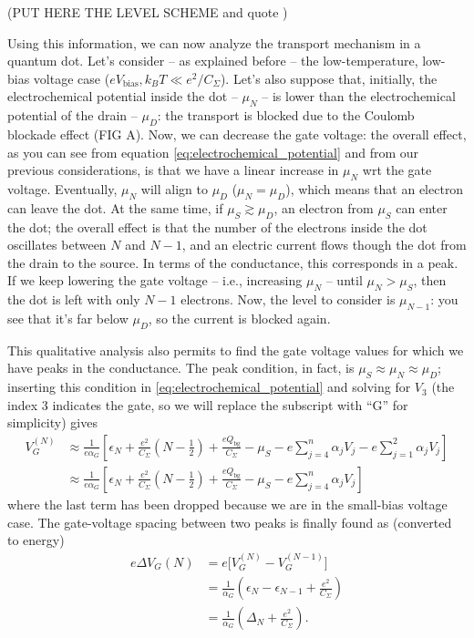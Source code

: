 \documentclass[a4paper,twoside,11pt]{book}
\begin{document}
(PUT HERE THE LEVEL SCHEME and quote \citep[adapted from][]{Fasth2007})

Using this information, we can now analyze the transport mechanism in a quantum dot. Let's consider -- as explained before -- the low-temperature, low-bias voltage case ($eV_{\text{bias}},k_BT \ll e^2/C_{\Sigma}$). Let's also suppose that, initially, the electrochemical potential inside the dot -- $\mu_N$ -- is lower than the electrochemical potential of the drain -- $\mu_D$: the transport is blocked due to the Coulomb blockade effect (FIG A). Now, we can decrease the gate voltage: the overall effect, as you can see from equation \eqref{eq:electrochemical_potential} and from our previous considerations, is that we have a linear increase in $\mu_N$ wrt the gate voltage. Eventually, $\mu_N$ will align to $\mu_D$ ($\mu_N = \mu_D$), which means that an electron can leave the dot. At the same time, if $\mu_S \gtrsim \mu_D$, an electron from $\mu_S$ can enter the dot; the overall effect is that the number of the electrons inside the dot oscillates between $N$ and $N-1$, and an electric current flows though the dot from the drain to the source. In terms of the conductance, this corresponds in a peak. If we keep lowering the gate voltage -- i.e., increasing $\mu_N$ -- until $\mu_N > \mu_S$, then the dot is left with only $N-1$ electrons. Now, the level to consider is $\mu_{N-1}$: you see that it's far below $\mu_D$, so the current is blocked again.

This qualitative analysis also permits to find the gate voltage values for which we have peaks in the conductance. The peak condition, in fact, is $\mu_S\approx\mu_N\approx\mu_D$; inserting this condition in \eqref{eq:electrochemical_potential} and solving for $V_3$ (the index 3 indicates the gate, so we will replace the subscript with ``G'' for simplicity) gives
\begin{align}
	V_G^{(N)}
	&\approx \frac{1}{e\alpha_G}\left[ \epsilon_N + \frac{e^2}{C_{\Sigma}}\left(N-\frac{1}{2}\right) + \frac{eQ_{\text{bg}}}{C_{\Sigma}} - \mu_S - e\sum_{j=4}^{n}\alpha_jV_j - e\sum_{j=1}^{2}\alpha_jV_j \right] \\
	&\approx \frac{1}{e\alpha_G}\left[ \epsilon_N + \frac{e^2}{C_{\Sigma}}\left(N-\frac{1}{2}\right) + \frac{eQ_{\text{bg}}}{C_{\Sigma}} - \mu_S - e\sum_{j=4}^{n}\alpha_jV_j \right]
\end{align}
where the last term has been dropped because we are in the small-bias voltage case. The gate-voltage spacing between two peaks is finally found as (converted to energy)
\begin{align}
	e\Delta V_G(N) 
	&= e\Big[V_G^{(N)}-V_G^{(N-1)}\Big] \\
	&= \frac{1}{\alpha_G}\left( \epsilon_N - \epsilon_{N-1} + \frac{e^2}{C_{\Sigma}} \right) \\
	&= \frac{1}{\alpha_G}\left( \Delta_N + \frac{e^2}{C_{\Sigma}} \right).
	\label{eq:DeltaVG_N_Vb0}
\end{align}
\end{document}
